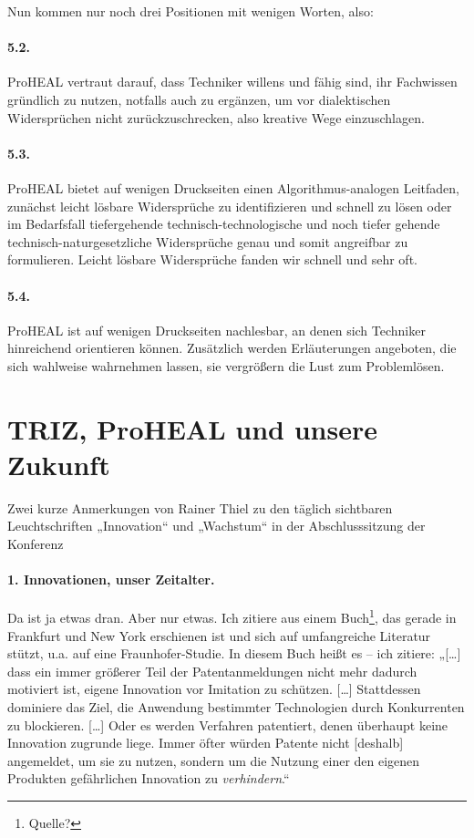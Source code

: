 \documentclass[12pt,a4paper]{article}
\begin{document}
Nun kommen nur noch drei Positionen mit wenigen Worten, also:

\paragraph{5.2.}
ProHEAL vertraut darauf, dass Techniker willens und fähig sind, ihr Fachwissen
gründlich zu nutzen, notfalls auch zu ergänzen, um vor dialektischen
Widersprüchen nicht zurückzuschrecken, also kreative Wege einzuschlagen.

\paragraph{5.3.}
ProHEAL bietet auf wenigen Druckseiten einen Algorithmus-analogen Leitfaden,
zunächst leicht lösbare Widersprüche zu identifizieren und schnell zu lösen
oder im Bedarfsfall tiefergehende technisch-technologische und noch tiefer
gehende technisch-naturgesetzliche Widersprüche genau und somit angreifbar zu
formulieren. Leicht lösbare Widersprüche fanden wir schnell und sehr oft.

\paragraph{5.4.}
ProHEAL ist auf wenigen Druckseiten nachlesbar, an denen sich Techniker
hinreichend orientieren können. Zusätzlich werden Erläuterungen angeboten, die
sich wahlweise wahrnehmen lassen, sie vergrößern die Lust zum Problemlösen.

\section*{TRIZ, ProHEAL und unsere Zukunft}

Zwei kurze Anmerkungen von Rainer Thiel zu den täglich sichtbaren
Leuchtschriften „Innovation“ und „Wachstum“ in der Abschlusssitzung der
Konferenz

\paragraph{1. Innovationen, unser Zeitalter.}
Da ist ja etwas dran. Aber nur etwas. Ich zitiere aus einem
Buch\footnote{Quelle?}, das gerade in Frankfurt und New York erschienen ist
und sich auf umfangreiche Literatur stützt, u.a. auf eine Fraunhofer-Studie.
In diesem Buch heißt es – ich zitiere: „[\ldots] dass ein immer größerer Teil
der Patentanmeldungen nicht mehr dadurch motiviert ist, eigene Innovation vor
Imitation zu schützen. [\ldots] Stattdessen dominiere das Ziel, die Anwendung
bestimmter Technologien durch Konkurrenten zu blockieren. [\ldots] Oder es
werden Verfahren patentiert, denen überhaupt keine Innovation zugrunde liege.
Immer öfter würden Patente nicht [deshalb] angemeldet, um sie zu nutzen,
sondern um die Nutzung einer den eigenen Produkten gefährlichen Innovation zu
\emph{verhindern}.“
\end{document}
